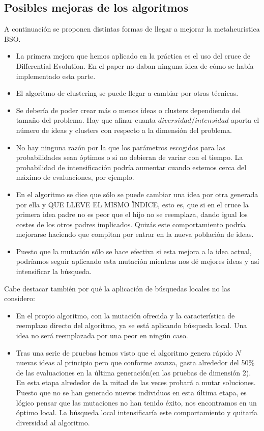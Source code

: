 \subsection{Posibles mejoras de los algoritmos}
A continuación se proponen distintas formas de llegar a mejorar la metaheuristica BSO.
\begin{itemize}
	\item La primera mejora que hemos aplicado en la práctica es el uso del cruce de Differential Evolution. En el paper no daban ninguna idea de cómo se había implementado esta parte.
	
	\item El algoritmo de clustering se puede llegar a cambiar por otras técnicas.
	
	\item Se debería de poder crear más o menos ideas o clusters dependiendo del tamaño del problema. Hay que afinar cuanta $diversidad/intensidad$ aporta el número de ideas y clusters con respecto a la dimensión del problema.
	
	\item No hay ninguna razón por la que los parámetros escogidos para las probabilidades sean óptimos o si no debieran de variar con el tiempo. La probabilidad de intensificación podría aumentar cuando estemos cerca del máximo de evaluaciones, por ejemplo.
	
	\item En el algoritmo se dice que sólo se puede cambiar una idea por otra generada por ella y QUE LLEVE EL MISMO ÏNDICE, esto es, que si en el cruce la primera idea padre no es peor que el hijo no se reemplaza, dando igual los costes de los otros padres implicados. Quizás este comportamiento podría mejorarse haciendo que compitan por entrar en la nueva población de ideas.
	
	\item Puesto que la mutación sólo se hace efectiva si esta mejora a la idea actual, podríamos seguir aplicando esta mutación mientras nos dé mejores ideas y así intensificar la búsqueda.
\end{itemize}

Cabe destacar también por qué la aplicación de búsquedas locales no las considero:

\begin{itemize}
	\item En el propio algoritmo, con la mutación ofrecida y la característica de reemplazo directo del algoritmo, ya se está aplicando búsqueda local. Una idea no será reemplazada por una peor en ningún caso.
	
	\item Tras una serie de pruebas hemos visto que el algoritmo genera rápido $N$ nuevas ideas al principio pero que conforme avanza, gasta alrededor del 50\% de las evaluaciones en la última generación(en las pruebas de dimensión 2). En esta etapa alrededor de la mitad de las veces probará a mutar soluciones. Puesto que no se han generado nuevos individuos en esta última etapa, es lógico pensar que las mutaciones no han tenido éxito, nos encontramos en un óptimo local. La búsqueda local intensificaría este comportamiento y quitaría diversidad al algoritmo.
\end{itemize}

